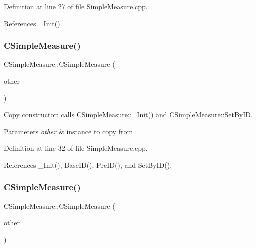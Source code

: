 Definition at line 27 of file Simple\+Measure.\+cpp.



References \+\_\+\+Init().

\mbox{\label{classCSimpleMeasure_a5dfc63fe4e75fb128991440c8b33b845}} 
\subsubsection{\texorpdfstring{C\+Simple\+Measure()}{CSimpleMeasure()}\hspace{0.1cm}{\footnotesize\ttfamily [2/3]}}
{\footnotesize\ttfamily C\+Simple\+Measure\+::\+C\+Simple\+Measure (\begin{DoxyParamCaption}\item[{const \hyperlink{classCSimpleMeasure}{C\+Simple\+Measure} \&}]{other }\end{DoxyParamCaption})}



Copy constructor\+: calls \hyperlink{classCSimpleMeasure_ada8744ac5a824143904a2ecaef2b0b70}{C\+Simple\+Measure\+::\+\_\+\+Init()} and \hyperlink{classCSimpleMeasure_a6945aa333dca5623482d38cd9a7e3225}{C\+Simple\+Measure\+::\+Set\+By\+ID}. 


\begin{DoxyParams}{Parameters}
{\em other} & instance to copy from \\
\hline
\end{DoxyParams}


Definition at line 32 of file Simple\+Measure.\+cpp.



References \+\_\+\+Init(), Base\+I\+D(), Pre\+I\+D(), and Set\+By\+I\+D().

\mbox{\label{classCSimpleMeasure_a0be2c11e276b999b8de941a5f94b0369}} 
\subsubsection{\texorpdfstring{C\+Simple\+Measure()}{CSimpleMeasure()}\hspace{0.1cm}{\footnotesize\ttfamily [3/3]}}
{\footnotesize\ttfamily C\+Simple\+Measure\+::\+C\+Simple\+Measure (\begin{DoxyParamCaption}\item[{const \hyperlink{classCSimpleMeasure}{C\+Simple\+Measure} $\ast$}]{other }\end{DoxyParamCaption})}



